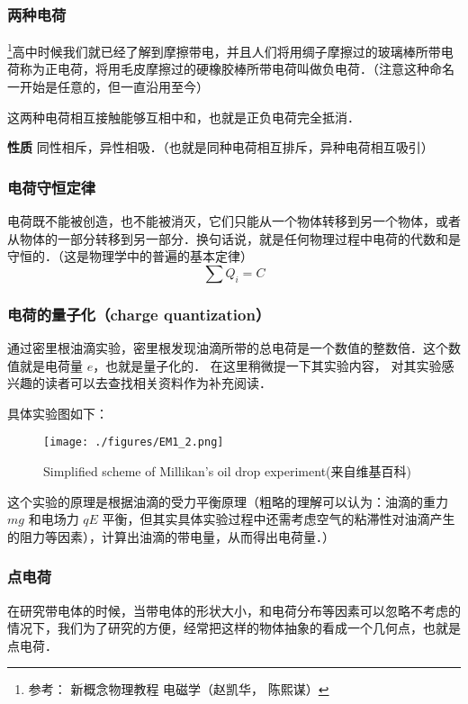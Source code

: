
\subsubsection{两种电荷}
\footnote{参考： 新概念物理教程 电磁学（赵凯华， 陈熙谋）}高中时候我们就已经了解到摩擦带电，并且人们将用绸子摩擦过的玻璃棒所带电荷称为正电荷，将用毛皮摩擦过的硬橡胶棒所带电荷叫做负电荷．（注意这种命名一开始是任意的，但一直沿用至今）

这两种电荷相互接触能够互相中和，也就是正负电荷完全抵消．

\textbf{性质} 同性相斥，异性相吸．（也就是同种电荷相互排斥，异种电荷相互吸引）

\subsubsection{电荷守恒定律}
电荷既不能被创造，也不能被消灭，它们只能从一个物体转移到另一个物体，或者从物体的一部分转移到另一部分．换句话说，就是任何物理过程中电荷的代数和是守恒的．（这是物理学中的普遍的基本定律）
\begin{equation}
\sum Q_i=C
\end{equation}

\subsubsection{电荷的量子化（charge quantization）}
 通过密里根油滴实验，密里根发现油滴所带的总电荷是一个数值的整数倍．这个数值就是电荷量 $e$，也就是量子化的．
 在这里稍微提一下其实验内容， 对其实验感兴趣的读者可以去查找相关资料作为补充阅读．

具体实验图如下：

\begin{figure}[ht]
\centering
\texttt{[image: ./figures/EM1\_2.png]}
\caption{Simplified scheme of Millikan's oil drop experiment(来自维基百科)} \label{EM1_fig1}
\end{figure}

这个实验的原理是根据油滴的受力平衡原理（粗略的理解可以认为：油滴的重力 $mg$ 和电场力 $qE$ 平衡，但其实具体实验过程中还需考虑空气的粘滞性对油滴产生的阻力等因素），计算出油滴的带电量，从而得出电荷量．）

\subsubsection{点电荷}

在研究带电体的时候，当带电体的形状大小，和电荷分布等因素可以忽略不考虑的情况下，我们为了研究的方便，经常把这样的物体抽象的看成一个几何点，也就是点电荷．

